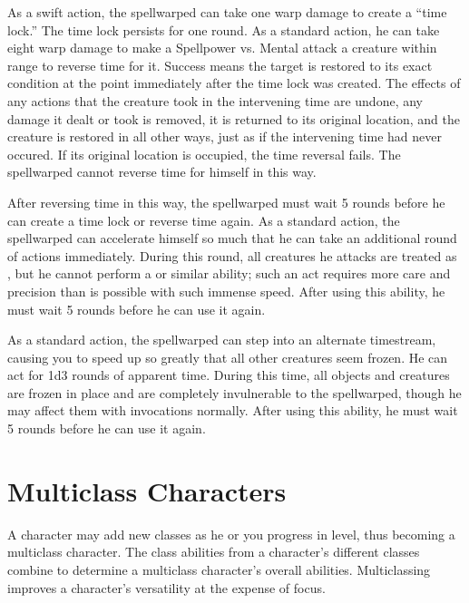             As a swift action, the spellwarped can take one warp damage to create a ``time lock.'' The time lock persists for one round.
            As a standard action, he can take eight warp damage to make a Spellpower vs. Mental attack a creature within \rngmed range to reverse time for it.
            Success means the target is restored to its exact condition at the point immediately after the time lock was created.
            The effects of any actions that the creature took in the intervening time are undone, any damage it dealt or took is removed, it is returned to its original location, and the creature is restored in all other ways, just as if the intervening time had never occured.
            If its original location is occupied, the time reversal fails.
            The spellwarped cannot reverse time for himself in this way.
            \par After reversing time in this way, the spellwarped must wait 5 rounds before he can create a time lock or reverse time again.
            As a standard action, the spellwarped can accelerate himself so much that he can take an additional round of actions immediately.
            During this round, all creatures he attacks are treated as \helpless, but he cannot perform a  or similar ability; such an act requires more care and precision than is possible with such immense speed.
            After using this ability, he must wait 5 rounds before he can use it again.

            As a standard action, the spellwarped can step into an alternate timestream, causing you to speed up so greatly that all other creatures seem frozen.
            He can act for 1d3 rounds of apparent time.
            During this time, all objects and creatures are frozen in place and are completely invulnerable to the spellwarped, though he may affect them with invocations normally.
            After using this ability, he must wait 5 rounds before he can use it again.

\section{Multiclass Characters}\label{Multiclass Characters}
    A character may add new classes as he or you progress in level, thus becoming a multiclass character.
    The class abilities from a character's different classes combine to determine a multiclass character's overall abilities.
    Multiclassing improves a character's versatility at the expense of focus.

